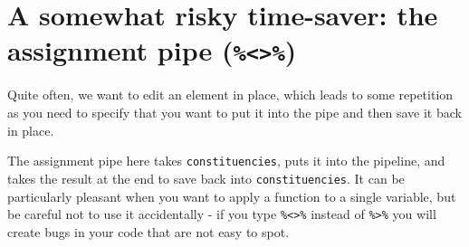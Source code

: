 \documentclass[
]{book}
\newenvironment{Shaded}{\begin{snugshade}}{\end{snugshade}}
\newcommand{\CommentTok}[1]{\textcolor[rgb]{0.56,0.35,0.01}{\textit{#1}}}
\newcommand{\DataTypeTok}[1]{\textcolor[rgb]{0.13,0.29,0.53}{#1}}
\newcommand{\KeywordTok}[1]{\textcolor[rgb]{0.13,0.29,0.53}{\textbf{#1}}}
\newcommand{\NormalTok}[1]{#1}
\newcommand{\OperatorTok}[1]{\textcolor[rgb]{0.81,0.36,0.00}{\textbf{#1}}}
\newcommand{\StringTok}[1]{\textcolor[rgb]{0.31,0.60,0.02}{#1}}
\begin{document}
\hypertarget{a-somewhat-risky-time-saver-the-assignment-pipe}{%
\section{\texorpdfstring{A somewhat risky time-saver: the assignment pipe (\texttt{\%\textless{}\textgreater{}\%})}{A somewhat risky time-saver: the assignment pipe (\%\textless\textgreater\%)}}\label{a-somewhat-risky-time-saver-the-assignment-pipe}}

Quite often, we want to edit an element in place, which leads to some repetition as you need to specify that you want to put it into the pipe and then save it back in place.

\begin{Shaded}
\end{Shaded}

The assignment pipe here takes \texttt{constituencies}, puts it into the pipeline, and takes the result at the end to save back into \texttt{constituencies}. It can be particularly pleasant when you want to apply a function to a single variable, but be careful not to use it accidentally - if you type \texttt{\%\textless{}\textgreater{}\%} instead of \texttt{\%\textgreater{}\%} you will create bugs in your code that are not easy to spot.

\begin{Shaded}
\end{Shaded}

  
\end{document}
